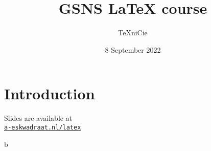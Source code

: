 \documentclass{../../cursuspresentatie}
\title{GSNS \LaTeX{} course}
\author{\TeX niCie}
\date{8 September 2022}
\begin{document}
\section{Introduction}

\begin{frame}
	\titlepage
	\centering

	Slides are available at\\
	\href{http://a-eskwadraat.nl/latex}{\ul{\texttt{a-eskwadraat.nl/latex}}}
\end{frame}


\begin{frame}
	b
\end{frame}

	

% 

% 

% 

% 

% 

% 

%
	
\end{document}
